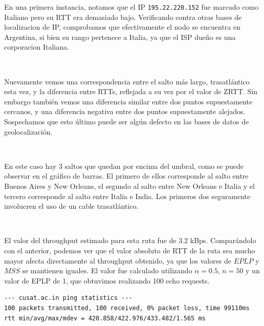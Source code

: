 \vspace{20pt}

En una primera instancia, notamos que el IP \verb|195.22.220.152| fue marcado como Italiano pero su RTT era demasiado bajo. Verificando contra otras bases de localizacion de IP, comprobamos que efectivamente el nodo se encuentra en Argentina, si bien su rango pertenece a Italia, ya que el ISP dueño es una corporacion Italiana.

~

Nuevamente vemos una correspondencia entre el salto más largo, trasatlántico esta vez, y la diferencia entre RTTs, reflejada a su vez por el valor de ZRTT. Sin embargo también vemos una diferencia similar entre dos puntos supuestamente cercanos, y una diferencia negativa entre dos puntos supuestamente alejados. Sospechamos que esto último puede ser algún defecto en las bases de datos de geolocalización.

~

En este caso hay 3 saltos que quedan por encima del umbral, como se puede observar en el gráfico de barras. El primero de ellos corresponde al salto entre Buenos Aires y New Orleans, el segundo al salto entre New Orleans e Italia y el tercero corresponde al salto entre Italia e India. Los primeros dos seguramente involucren el uso de un cable trasatlántico.

~

El valor del throughput estimado para esta ruta fue de $3.2$ kBps. Comparándolo con el anterior, podemos ver que el valor absoluto de RTT de la ruta sea mucho mayor afecta directamente al throughput obtenido, ya que los valores de $EPLP$ y $MSS$ se mantienen iguales. El valor fue calculado utilizando $\alpha = 0.5$, $n = 50$ y un valor de EPLP de 1, que obtuvimos realizando 100 echo requests.

\begin{verbatim}
--- cusat.ac.in ping statistics ---
100 packets transmitted, 100 received, 0% packet loss, time 99110ms
rtt min/avg/max/mdev = 420.858/422.976/433.482/1.565 ms
\end{verbatim}

